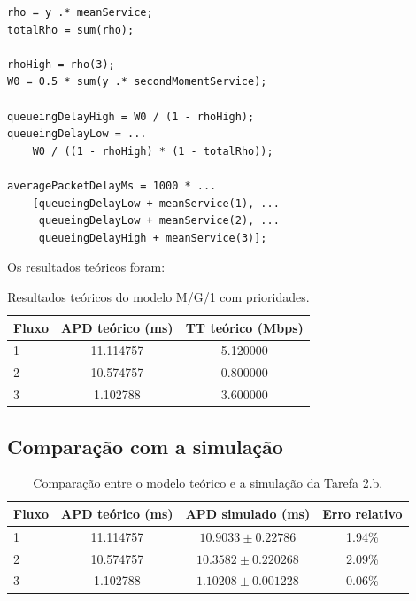 \documentclass[11pt,a4paper]{article}
\begin{document}
\begin{lstlisting}[basicstyle=\ttfamily\scriptsize]
rho = y .* meanService;
totalRho = sum(rho);

rhoHigh = rho(3);
W0 = 0.5 * sum(y .* secondMomentService);

queueingDelayHigh = W0 / (1 - rhoHigh);
queueingDelayLow = ...
    W0 / ((1 - rhoHigh) * (1 - totalRho));

averagePacketDelayMs = 1000 * ...
    [queueingDelayLow + meanService(1), ...
     queueingDelayLow + meanService(2), ...
     queueingDelayHigh + meanService(3)];
\end{lstlisting}

Os resultados teóricos foram:

\begin{table}[htbp]
    \centering
    \caption{Resultados teóricos do modelo M/G/1 com prioridades.}
    \label{tab:2c-theory}
    \begin{tabular}{lcc}
        \toprule
        Fluxo & APD teórico (ms) & TT teórico (Mbps) \\
        \midrule
        1 & 11.114757 & 5.120000 \\
        2 & 10.574757 & 0.800000 \\
        3 & 1.102788  & 3.600000 \\
        \bottomrule
    \end{tabular}
\end{table}

\subsection*{Comparação com a simulação}

\begin{table}[htbp]
    \centering
    \caption{Comparação entre o modelo teórico e a simulação da Tarefa 2.b.}
    \label{tab:2c-comparison}
    \begin{tabular}{lccc}
        \toprule
        Fluxo & APD teórico (ms) & APD simulado (ms) & Erro relativo \\
        \midrule
        1 & 11.114757 & $10.9033 \pm 0.22786$ & 1.94\% \\
        2 & 10.574757 & $10.3582 \pm 0.220268$ & 2.09\% \\
        3 & 1.102788  & $1.10208 \pm 0.001228$ & 0.06\% \\
        \bottomrule
    \end{tabular}
\end{table}
\end{document}
